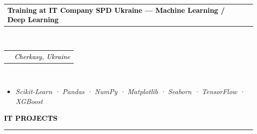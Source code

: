 \documentclass[10pt,english,french]{article}
\makeatletter
\newcommand{\itProjectIcon}[1][black]{\textcolor{#1}{\faLaptopCode}}
\newlength{\mpwidth}
\newcommand{\cvsection}[1]{
    \vspace{4pt}
    \textbf{\fontsize{9pt}{10pt}\selectfont \textcolor{black}{#1}}
    \vspace{6pt}
    \hrule
    \vspace{6pt}
}
\newcommand{\cvevent}[2]{
    \vspace{2pt}
    \parbox{\mpwidth}{
        \begin{tabular*}{1\mpwidth}{@{\extracolsep{\fill}} l r}
            \textcolor{black}{\textbf{\fontsize{11}{12}\selectfont #1}} & \textcolor{black}{\textbf{\fontsize{12}{12}\selectfont #2}} \\
        \end{tabular*}\\[-8pt] %
    }
}
\newcommand{\cvsubevent}[2]{
    \parbox{\mpwidth}{
        \begin{tabular*}{1\mpwidth}{@{\extracolsep{\fill}} l r}
            \textcolor{black}{\textit{\fontsize{10}{12}\selectfont #1}} & \textcolor{black}{\textit{\fontsize{10}{12}\selectfont #2}} \\
        \end{tabular*}\\[-8pt] %
    }
    \vspace{-10pt}
}
\makeatother
\begin{document}
\vspace{-5pt}
\cvevent{\textbf{Training at IT Company SPD Ukraine} --- Machine Learning / Deep Learning}{\fontsize{11pt}{11pt}\selectfont 2022}
\cvsubevent{}{Cherkasy, Ukraine}
\vspace{-18pt}
\begin{itemize}[leftmargin=0.75cm,label=\textendash,itemsep=0em,topsep=0.2em]
    \item \textit{\fontsize{10pt}{9pt}\selectfont Scikit-Learn · Pandas · NumPy · Matplotlib · Seaborn · TensorFlow · XGBoost}
\end{itemize}

\vspace{-5pt}
\vspace{-1pt}
\cvsection{\itProjectIcon[black]\hspace{4pt}IT PROJECTS}
\end{document}
